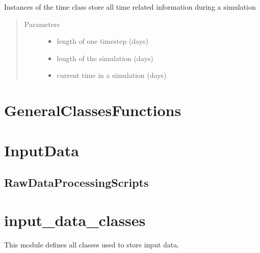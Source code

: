 \documentclass[letterpaper,10pt,english]{sphinxmanual}
\begin{document}
\begin{fulllineitems}
\label{\detokenize{index:feast.EmissionSimModules.simulation_classes.Time}}
Instances of the time class store all time related information during a simulation
\begin{quote}\begin{description}
\item[{Parameters}] \leavevmode\begin{itemize}
\item {} 
 \textendash{} length of one timestep (days)

\item {} 
 \textendash{} length of the simulation (days)

\item {} 
 \textendash{} current time in a simulation (days)

\end{itemize}

\end{description}\end{quote}

\end{fulllineitems}



\section{GeneralClassesFunctions}
\label{\detokenize{index:generalclassesfunctions}}

\section{InputData}
\label{\detokenize{index:inputdata}}

\subsection{RawDataProcessingScripts}
\label{\detokenize{index:rawdataprocessingscripts}}

\section{input\_data\_classes}
\label{\detokenize{index:module-feast.input_data_classes}}\label{\detokenize{index:input-data-classes}}
This module defines all classes used to store input data.
\end{document}
